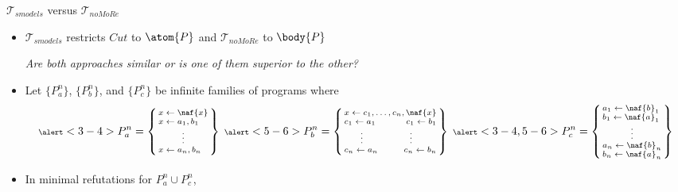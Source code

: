 \begin{frame}{${\mathcal{T}}_{\textit{smodels}}$ versus ${\mathcal{T}}_{\textit{noMoRe}}$}
  \begin{itemize}
  \item<1-> \alert<8>{${\mathcal{T}}_{\textit{smodels}}$} restricts $\textit{Cut}$ to $\atom{P}$ and \alert<7>{${\mathcal{T}}_{\textit{noMoRe}}$} to $\body{P}$

    \alert<1>{\em Are both approaches similar or is one of them superior to the other?}
    \medskip
  \item<2-> Let $\{P^n_a\}$, $\{P^n_b\}$, and $\{P^n_c\}$ be infinite families of programs where
    \[\scriptsize\hspace{-3pt}
    \alert<3-4>{P^n_a} =
    \left\{
      \begin{array}{@{\,}l@{\,}}
        x \leftarrow \naf{x}      \\
        x \leftarrow a_1, b_1     \\
        \multicolumn{1}{c}{\vdots}\\
        x \leftarrow a_n, b_n
      \end{array}
    \right\}
    \
    \alert<5-6>{P^n_b} =
    \left\{
      \begin{array}{@{\,}l@{\ }c@{\ }r@{\,}}
        \multicolumn{3}{@{\,}l@{\,}}{x \leftarrow c_1,\dots,c_n,\naf{x}}   \\
        c_1 \leftarrow a_1                                                 &&
        c_1 \leftarrow b_1                                                 \\
        \multicolumn{1}{c}{\vdots}                                         &&
        \multicolumn{1}{c}{\vdots}                                         \\
        c_n \leftarrow a_n                                                 &&
        c_n \leftarrow b_n
      \end{array}
    \right\}
    \
    \alert<3-4,5-6>{P_c^n} =
    \left\{
      \begin{array}{@{\,}l@{\,}}
        a_1 \leftarrow \naf{b}_1  \\
        b_1 \leftarrow \naf{a}_1  \\
        \multicolumn{1}{c}{\vdots}\\
        a_n \leftarrow \naf{b}_n  \\
        b_n \leftarrow \naf{a}_n
      \end{array}
    \right\}
    \]
  \item <3->
    In \alert<3>{minimal refutations} for \alert<3>{$P^n_a\cup P^n_c$},

\end{itemize}
\end{frame}
